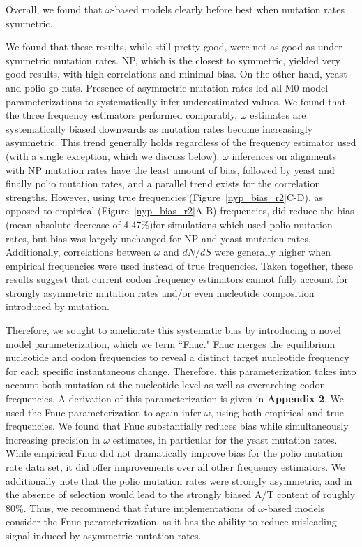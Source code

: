 \documentclass{pnastwo}
\begin{document}
\begin{article}
Overall, we found that $\omega$-based models clearly before best when mutation rates symmetric.

We found that these results, while still pretty good, were not as good as under symmetric mutation rates. NP, which is the closest to symmetric, yielded very good results, with high correlations and minimal bias. On the other hand, yeast and polio go nuts. Presence of asymmetric mutation rates led all M0 model parameterizations to systematically infer underestimated values. 
We found that the three frequency estimators performed comparably, $\omega$ estimates are systematically biased downwards as mutation rates become increasingly asymmetric. This trend generally holds regardless of the frequency estimator used (with a single exception, which we discuss below). $\omega$ inferences on alignments with NP mutation rates have the least amount of bias, followed by yeast and finally polio mutation rates, and a parallel trend exists for the correlation strengths. However, using true frequencies (Figure~\ref{nyp_bias_r2}C-D), as opposed to empirical (Figure~\ref{nyp_bias_r2}A-B) frequencies, did reduce the bias (mean absolute decrease of 4.47\%)for simulations which used polio mutation rates, but bias was largely unchanged for NP and yeast mutation rates. Additionally, correlations between $\omega$ and $dN/dS$ were generally higher when empirical frequencies were used instead of true frequencies. Taken together, these results suggest that current codon frequency estimators cannot fully account for strongly asymmetric mutation rates and/or even nucleotide composition introduced by mutation. 

Therefore, we sought to ameliorate this systematic bias by introducing a novel model parameterization, which we term ``Fnuc." Fnuc merges the equilibrium nucleotide and codon frequencies to reveal a distinct target nucleotide frequency for each specific instantaneous change. Therefore, this parameterization takes into account both mutation at the nucleotide level as well as overarching codon frequencies. A derivation of this parameterization is given in \textbf{Appendix 2}. We used the Fnuc parameterization to again infer $\omega$, using both empirical and true frequencies. We found that Fnuc substantially reduces bias while simultaneously increasing precision in $\omega$ estimates, in particular for the yeast mutation rates. While empirical Fnuc did not dramatically improve bias for the polio mutation rate data set, it did offer improvements over all other frequency estimators. We additionally note that the polio mutation rates were strongly asymmetric, and in the absence of selection would lead to the strongly biased A/T content of roughly 80\%. Thus, we recommend that future implementations of $\omega$-based models consider the Fnuc parameterization, as it has the ability to reduce misleading signal induced by asymmetric mutation rates.


\end{article}
\end{document}
